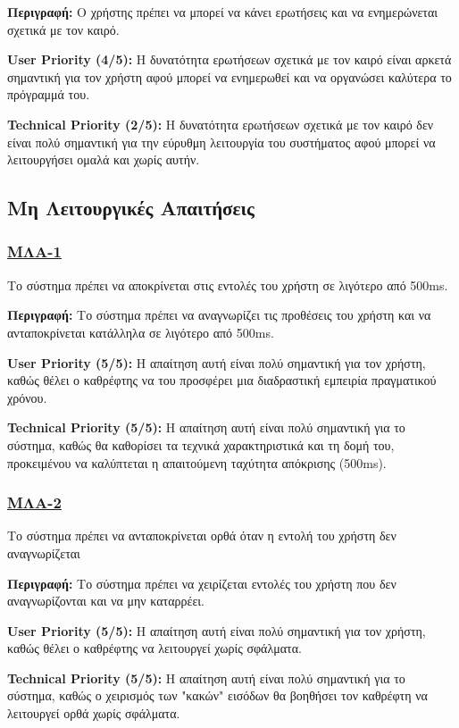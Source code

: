 \noindent\textbf{Περιγραφή:} Ο χρήστης πρέπει να μπορεί να κάνει ερωτήσεις και να ενημερώνεται σχετικά με τον καιρό.

\noindent\textbf{User Priority (4/5):} Η δυνατότητα ερωτήσεων σχετικά με τον καιρό είναι αρκετά σημαντική για τον χρήστη αφού μπορεί να ενημερωθεί και να οργανώσει καλύτερα το πρόγραμμά του.

\noindent\textbf{Technical Priority (2/5):} Η δυνατότητα ερωτήσεων σχετικά με τον καιρό δεν είναι πολύ σημαντική για την εύρυθμη λειτουργία του συστήματος αφού μπορεί να λειτουργήσει ομαλά και χωρίς αυτήν.


\noindent\subsection{Μη Λειτουργικές Απαιτήσεις}

\subsubsection{\underline{ΜΛΑ-1}}
\noindent Το σύστημα πρέπει να αποκρίνεται στις εντολές του χρήστη σε λιγότερο από 500ms.

\noindent\textbf{Περιγραφή:} Το σύστημα πρέπει να αναγνωρίζει τις προθέσεις του χρήστη και να ανταποκρίνεται κατάλληλα σε λιγότερο από 500ms.

\noindent\textbf{User Priority (5/5):} Η απαίτηση αυτή είναι πολύ σημαντική για τον χρήστη, καθώς θέλει ο καθρέφτης να του προσφέρει μια διαδραστική εμπειρία πραγματικού χρόνου.

\noindent\textbf{Technical Priority (5/5):} Η απαίτηση αυτή είναι πολύ σημαντική για το σύστημα, καθώς θα καθορίσει τα τεχνικά χαρακτηριστικά και τη δομή του, προκειμένου να καλύπτεται η απαιτούμενη ταχύτητα απόκρισης (500ms).

\subsubsection{\underline{ΜΛΑ-2}}
\noindent Το σύστημα πρέπει να ανταποκρίνεται ορθά όταν η εντολή του χρήστη δεν αναγνωρίζεται

\noindent\textbf{Περιγραφή:} Το σύστημα πρέπει να χειρίζεται εντολές του χρήστη που δεν αναγνωρίζονται και να μην καταρρέει.

\noindent\textbf{User Priority (5/5):} Η απαίτηση αυτή είναι πολύ σημαντική για τον χρήστη, καθώς θέλει ο καθρέφτης να λειτουργεί χωρίς σφάλματα.

\noindent\textbf{Technical Priority (5/5):} Η απαίτηση αυτή είναι πολύ σημαντική για το σύστημα, καθώς ο χειρισμός των "κακών" εισόδων θα βοηθήσει τον καθρέφτη να λειτουργεί ορθά χωρίς σφάλματα.

